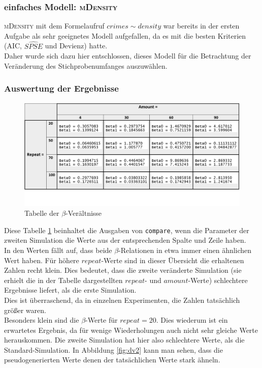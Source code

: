 \subsubsection{einfaches Modell: \textsc{mDensity}}
\textsc{mDensity} mit dem Formelaufruf $crimes \sim density$ war bereits in der ersten Aufgabe als sehr geeignetes Modell aufgefallen, da es mit die besten Kriterien (AIC, $\hat{SPSE}$ und Devienz) hatte. \\
Daher wurde sich dazu hier entschlossen, dieses Modell f\"ur die Betrachtung der Ver\"anderung des Stichprobenumfanges auszuw\"ahlen.

\subsubsection{Auswertung der Ergebnisse}
\begin{figure}
\centering
\includegraphics[width=\textwidth]{./jpgs/tabelle.jpg}
\caption{Tabelle der $\beta$-Ver\"altnisse}
\label{fig:aus}
\end{figure} 

Diese Tabelle \ref{fig:aus} beinhaltet die Ausgaben von \texttt{compare}, wenn die Parameter der zweiten Simulation die Werte aus der entsprechenden Spalte und Zeile haben. \\
 
In den Werten f\"allt auf, dass beide $\beta$-Relationen in etwa immer einen \"ahnlichen Wert haben.
F\"ur h\"ohere $repeat$-Werte sind in dieser \"Ubersicht die erhaltenen Zahlen recht klein.
Dies bedeutet, dass die zweite ver\"anderte Simulation (sie erhielt die in der Tabelle dargestellten $repeat$- und $amount$-Werte) schlechtere Ergebnisse liefert, als die erste Simulation. \\
Dies ist \"uberraschend, da in einzelnen Experimenten, die Zahlen tats\"achlich gr\"o\ss{}er waren. \\
Besonders klein sind die $\beta$-Werte f\"ur $repeat = 20$. Dies wiederum ist ein erwartetes Ergebnis, da f\"ur wenige Wiederholungen auch nicht sehr gleiche Werte herauskommen.
Die zweite Simulation hat hier also schlechtere Werte, als die Standard-Simulation.
In Abbildung \ref{fig:dv2} kann man sehen, dass die pseudogenerierten Werte denen der tats\"achlichen Werte stark \"ahneln.

